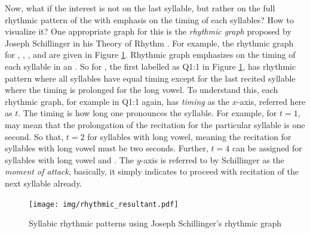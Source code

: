 Now, what if the interest is not on the last syllable, but rather on the full rhythmic pattern of the   with emphasis on the timing of each syllables? How to visualize it? One appropriate graph for this is the \textit{rhythmic graph} proposed by Joseph Schillinger in his Theory of Rhythm \cite{schillinger1946schillinger}. For example, the rhythmic graph for  ,  ,  , and   are given in Figure \ref{fig:result_syllabic_rhythmic_graph}. Rhythmic graph emphasizes on the timing of each syllable in an  . So for , the first   labelled as Q1:1 in Figure \ref{fig:result_syllabic_rhythmic_graph}, has rhythmic pattern where all syllables have equal timing except for the last recited syllable where the timing is prolonged for the long vowel. To understand this, each rhythmic graph, for example in Q1:1 again, has \textit{timing} as the $x$-axis, referred here as $t$. The timing is how long one pronounces the syllable. For example, for $t=1$, may mean that the prolongation of the recitation for the particular syllable is one second. So that, $t=2$ for syllables with long vowel, meaning the recitation for syllables with long vowel must be two seconds. Further, $t=4$ can be assigned for syllables with long vowel and  . The $y$-axis is referred to by Schillinger as the \textit{moment of attack}, basically, it simply indicates to proceed with recitation of the next syllable already. 

\begin{figure}[!t]
    \centering
    \texttt{[image: img/rhythmic\_resultant.pdf]}
    \caption{Syllabic rhythmic patterns using Joseph Schillinger's rhythmic graph}
    \label{fig:result_syllabic_rhythmic_graph}
\end{figure}

